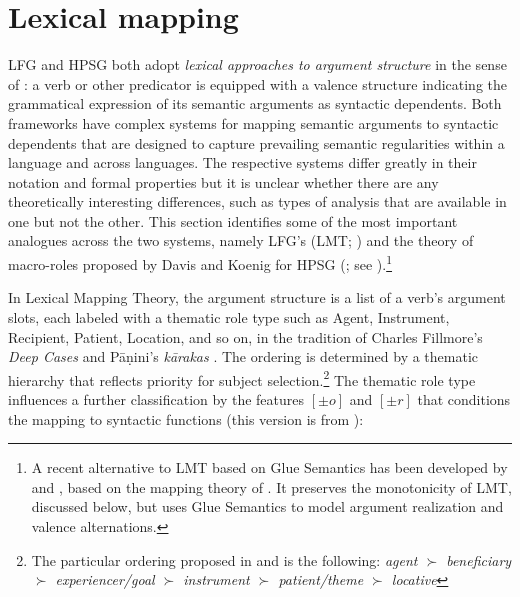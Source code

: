 \section{Lexical mapping}
LFG and HPSG both adopt \textit{lexical approaches to argument structure} in the sense of \citet{MWArgSt}: a verb or other predicator is equipped with a valence structure indicating the grammatical expression of its semantic arguments as syntactic dependents.  Both frameworks have complex systems for mapping semantic arguments to syntactic dependents that are designed to capture prevailing semantic regularities within a language and across languages.   The respective systems differ greatly in their notation and formal properties but it is unclear whether 
there are any theoretically interesting differences, such as types of analysis that are available in one but not the other.  This section identifies some of the most important  analogues across the two systems, namely LFG's  (LMT; \cite[Chapter 14]{BATW2016a}) and the theory of macro-roles proposed by Davis and Koenig for HPSG (\citealt{Davis96a-u,DK2000b-u}; see ).\footnote{A recent alternative to LMT based on Glue Semantics has been developed by \citet{asudeh;giorgolo-lfg12} and \citet{asudeh;ea14-lfg}, based on the mapping theory of \citet{findlay16}. It preserves the monotonicity of LMT, discussed below, but uses Glue Semantics to model argument realization and valence alternations.}
 
In Lexical Mapping Theory, the argument structure is a list of a verb's argument slots, each labeled with a thematic role type such as Agent, Instrument, Recipient, Patient, Location, and so on, in the tradition of Charles Fillmore's \textit{Deep Cases} \citep{Fillmore68,Fillmore77} and P\={a}\d{n}ini's \textit{k\={a}rakas} \citep{kiparsky+staal:1969}.  The ordering is determined by a thematic hierarchy that reflects priority for subject selection.\footnote{The particular ordering proposed in \cite[23]{BresnanK89a-u} and 
\cite[329]{BATW2016a} is the following:  
{\it agent $\succ$ beneficiary $\succ$
experiencer/goal $\succ$ instrument $\succ$ patient/theme $\succ$
locative}}  The thematic role type influences a further classification by the features $[\pm o]$ and $[\pm r]$ that conditions the mapping to syntactic functions (this version is from \citet[331]{BATW2016a}):

